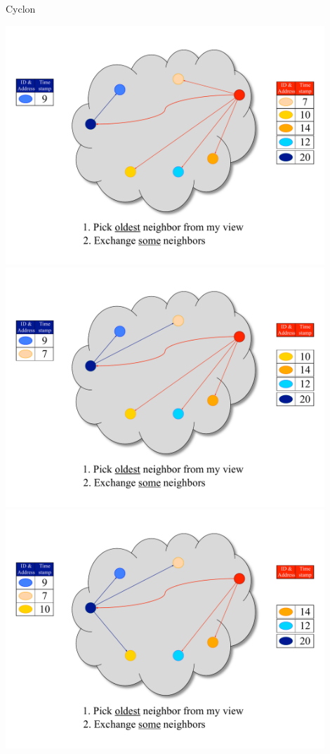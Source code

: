 \begin{frame}{Cyclon}
\begin{overprint}
\includegraphics[width=0.9\textwidth]{7_cyclon}
\includegraphics[width=0.9\textwidth]{8_cyclon}
\includegraphics[width=0.9\textwidth]{9_cyclon}
\end{overprint}
\end{frame}


